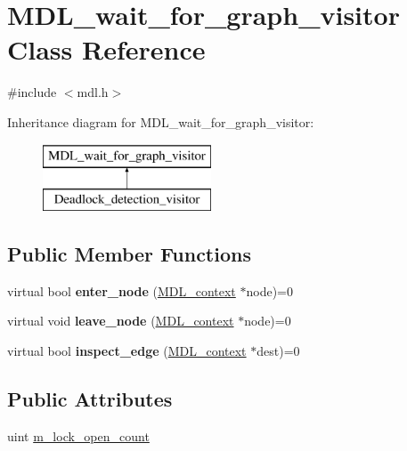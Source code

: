 \hypertarget{classMDL__wait__for__graph__visitor}{}\section{M\+D\+L\+\_\+wait\+\_\+for\+\_\+graph\+\_\+visitor Class Reference}
\label{classMDL__wait__for__graph__visitor}


{\ttfamily \#include $<$mdl.\+h$>$}

Inheritance diagram for M\+D\+L\+\_\+wait\+\_\+for\+\_\+graph\+\_\+visitor\+:\begin{figure}[H]
\begin{center}
\leavevmode
\includegraphics[height=2.000000cm]{classMDL__wait__for__graph__visitor}
\end{center}
\end{figure}
\subsection*{Public Member Functions}
\begin{DoxyCompactItemize}
\item 
\mbox{\label{classMDL__wait__for__graph__visitor_a2259e75285cccd10033a2149210380e4}} 
virtual bool {\bfseries enter\+\_\+node} (\mbox{\hyperlink{classMDL__context}{M\+D\+L\+\_\+context}} $\ast$node)=0
\item 
\mbox{\label{classMDL__wait__for__graph__visitor_ada707ebe023838f7f8a92bbd05385ad5}} 
virtual void {\bfseries leave\+\_\+node} (\mbox{\hyperlink{classMDL__context}{M\+D\+L\+\_\+context}} $\ast$node)=0
\item 
\mbox{\label{classMDL__wait__for__graph__visitor_ad16d349c249c3d6d2ec4959e90a04d77}} 
virtual bool {\bfseries inspect\+\_\+edge} (\mbox{\hyperlink{classMDL__context}{M\+D\+L\+\_\+context}} $\ast$dest)=0
\end{DoxyCompactItemize}
\subsection*{Public Attributes}
\begin{DoxyCompactItemize}
\item 
uint \mbox{\hyperlink{classMDL__wait__for__graph__visitor_ad2e6efb3798e08ce8efa992b0ccbba38}{m\+\_\+lock\+\_\+open\+\_\+count}}
\end{DoxyCompactItemize}



